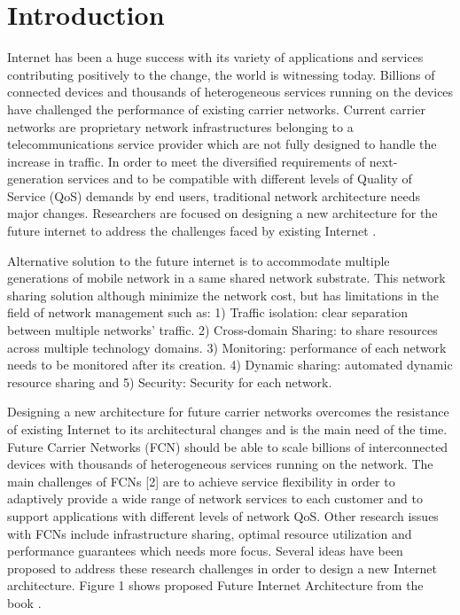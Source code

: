 \documentclass[article,dr=phil,type=msc ,colorback,accentcolor=tud4b]{tudthesis}
\begin{document}
    {}
  \author{Tejamurthy Shivakumar}
  \dateofexam{\today}{\today}
  \makethesistitle
  \setcounter{page}{0}
\tableofcontents


\newpage

 \section{Introduction}
 
Internet has been a huge success with its variety of applications and services contributing positively to the change, the world is witnessing today. Billions of connected devices and thousands of heterogeneous services running on the devices have challenged the performance of existing carrier networks. Current carrier networks are proprietary network infrastructures belonging to a telecommunications service provider which are not fully designed to handle the increase in traffic. In order to meet the diversified requirements of next-generation services and to be compatible with different levels of Quality of Service (QoS) demands by end users, traditional network architecture needs major changes. Researchers are focused on designing a new architecture for the future internet to address the challenges faced by existing Internet \cite{ 4086425}. \newline
 
 Alternative solution to the future internet is to accommodate multiple generations of mobile network in a same shared network substrate. This network sharing \cite{nw_sharing} solution although minimize the network cost, but has limitations in the field of network management such as: 1) Traffic isolation: clear separation between multiple networks' traffic. 2) Cross-domain Sharing: to share resources across multiple technology domains. 3) Monitoring: performance of each network needs to be monitored after its creation. 4) Dynamic sharing: automated dynamic resource sharing and 5) Security: Security for each network.\newline 
 
Designing a new architecture for future carrier networks overcomes the resistance of existing Internet to its architectural changes and is the main need of the time.  Future Carrier Networks (FCN) should be able to scale billions of interconnected devices with thousands of heterogeneous services running on the network. The main challenges of FCNs [2] are to achieve service flexibility in order to adaptively provide a wide range of network services to each customer and to support applications with different levels of network QoS. Other research issues with FCNs include infrastructure sharing, optimal resource utilization and performance guarantees which needs more focus. Several ideas have been proposed to address these research challenges in order to design a new Internet architecture. Figure 1 shows proposed Future Internet Architecture from the book \cite{fcn_arc}. 
 
\end{document}
